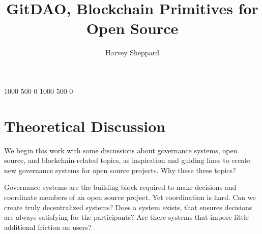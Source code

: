 \documentclass[english]{yMasterThesis}
\title{GitDAO, Blockchain Primitives for Open Source}
\author{Harvey Sheppard}
\begin{document}


\printtableofcontents

\justifying%
\setlength{\parindent}{0ex}

 1000 500 0 %
 1000 500 0 %


\sloppy



\part{Theoretical Discussion}

\partSecondPage%
We begin this work with some discussions about governance systems, open source, and blockchain-related topics, as inspiration and guiding lines to create new governance systems for open source projects.
Why these three topics?

Governance systems are the building block required to make decisions and coordinate members of an open source project.
Yet coordination is hard.
Can we create truly decentralized systems?
Does a system exists, that ensures decisions are always satisfying for the participants?
Are there systems that impose little additional friction on users?
\end{document}
